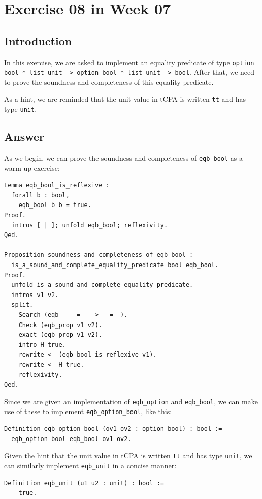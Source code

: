 \documentclass{article}
\begin{document}
\section{Exercise 08 in Week 07}

\subsection{Introduction}
In this exercise, we are asked to implement an equality predicate of type \texttt{option bool * list unit -> option bool * list unit -> bool}. After that, we need to prove the soundness and completeness of this equality predicate. 

As a hint, we are reminded that the unit value in tCPA is written \texttt{tt} and has type \texttt{unit}.

\subsection{Answer}
As we begin, we can prove the soundness and completeness of \texttt{eqb\_bool} as a warm-up exercise:

\begin{lstlisting}
Lemma eqb_bool_is_reflexive :
  forall b : bool,
    eqb_bool b b = true.
Proof.
  intros [ | ]; unfold eqb_bool; reflexivity.
Qed.

Proposition soundness_and_completeness_of_eqb_bool :
  is_a_sound_and_complete_equality_predicate bool eqb_bool.
Proof.
  unfold is_a_sound_and_complete_equality_predicate.
  intros v1 v2.
  split.
  - Search (eqb _ _ = _ -> _ = _).
    Check (eqb_prop v1 v2).
    exact (eqb_prop v1 v2).
  - intro H_true.
    rewrite <- (eqb_bool_is_reflexive v1).
    rewrite <- H_true.
    reflexivity.
Qed.
\end{lstlisting}
Since we are given an implementation of \texttt{eqb\_option} and \texttt{eqb\_bool}, we can make use of these to implement \texttt{eqb\_option\_bool}, like this:

\begin{lstlisting}
Definition eqb_option_bool (ov1 ov2 : option bool) : bool :=
  eqb_option bool eqb_bool ov1 ov2.
\end{lstlisting}

Given the hint that the unit value in tCPA is written \texttt{tt} and has type \texttt{unit}, we can similarly implement \texttt{eqb\_unit} in a concise manner:

\begin{lstlisting}
Definition eqb_unit (u1 u2 : unit) : bool :=
    true.
\end{lstlisting}
\end{document}
